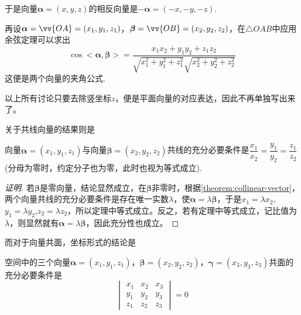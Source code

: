 于是向量$\bm{\alpha}=(x,y,z)$的相反向量是$-\bm{\alpha}=(-x,-y,-z)$.

再设$\bm{\alpha}=\vv{OA}=(x_1,y_1,z_1)$，$\bm{\beta}=\vv{OB}=(x_2,y_2,z_2)$，在$\triangle OAB$中应用余弦定理可以求出
\[ \cos{<\bm{\alpha},\bm{\beta}>} = \frac{x_1x_2+y_1y_2+z_1z_2}{\sqrt{x_1^2+y_1^2+z_1^2} \sqrt{x_2^2+y_2^2+z_2^2}} \]
这便是两个向量的夹角公式.

以上所有讨论只要去除竖坐标$z$，便是平面向量的对应表达，因此不再单独写出来了。

关于共线向量的结果则是
\begin{theorem}
  \label{theorem:collinear-vector-codrnation}
  向量$\bm{\alpha}=(x_1,y_1,z_1)$与向量$\bm{\beta}=(x_2,y_2,z_2)$共线的充分必要条件是$\dfrac{x_1}{x_2}=\dfrac{y_1}{y_2}=\dfrac{z_1}{z_2}$(分母为零时，约定分子也为零，此时也视为等式成立).
\end{theorem}

\begin{proof}[证明]
 若$\bm{\beta}$是零向量，结论显然成立，在$\bm{\beta}$非零时，根据\autoref{theorem:collinear-vector}，两个向量共线的充分必要条件是存在唯一实数$\lambda$，使$\bm{\alpha} = \lambda \bm{\beta}$，于是$x_1=\lambda x_2$,$y_1 = \lambda y_2$,$z_2=\lambda z_2$，所以定理中等式成立。反之，若有定理中等式成立，记比值为$\lambda$，则显然就有$\bm{\alpha}=\lambda \bm{\beta}$，因此充分性也成立。
\end{proof}

而对于向量共面，坐标形式的结论是
\begin{theorem}
  \label{theorem:coplanear-vector-cordination}
  空间中的三个向量$\bm{\alpha}=(x_1,y_1,z_1)$，$\bm{\beta}=(x_2,y_2,z_2)$，$\bm{\gamma}=(x_3,y_3,z_3)$共面的充分必要条件是
\[
  \begin{vmatrix}
    x_1 & x_2 & x_3\\
    y_1 & y_2 & y_3 \\
    z_1 & z_2 & z_3 
  \end{vmatrix}
  = 0
\]
\end{theorem}

